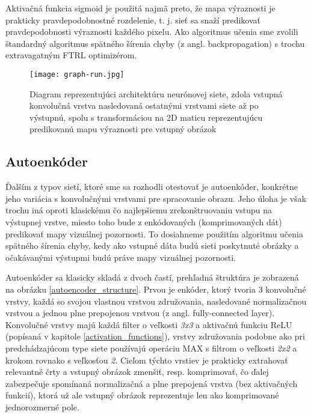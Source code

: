 Aktivačná funkcia sigmoid je použitá najmä preto, že mapa výraznosti je prakticky pravdepodobnostné rozdelenie, t. j. sieť sa snaží predikovať pravdepodobnosti výraznosti každého pixelu. Ako algoritmus učenia sme zvolili štandardný algoritmus spätného šírenia chyby (z angl. backpropagation) s trochu extravagatným FTRL optimizérom.

\begin{figure}[H]
	\begin{center}\texttt{[image: graph-run.jpg]}
		\caption[Návrh architektúry neurónovej siete]{
			Diagram reprezentujúci architektúru neurónovej siete, zdola vstupná konvolučná vrstva nasledovaná ostatnými vrstvami siete až po výstupnú, spolu s transformáciou na 2D maticu reprezentujúcu predikovanú mapu výraznosti pre vstupný obrázok
		}\label{my_tensorboard_cnn}
	\end{center}
\end{figure}

\subsection{Autoenkóder}
\label{autoencoder_design}
Ďalším z typov sietí, ktoré sme sa rozhodli otestovať je autoenkóder, konkrétne jeho variácia s konvolučnými vrstvami pre spracovanie obrazu. Jeho úloha je však trochu iná oproti klasickému čo najlepšiemu zrekonštruovaniu vstupu na výstupnej vrstve, miesto toho bude z enkódovaných (komprimovaných dát) predikovať mapy vizuálnej pozornosti. To dosiahneme použitím algoritmu učenia spätného šírenia chyby, kedy ako vstupné dáta budú sieti poskytnuté obrázky a očakávanými výstupmi budú práve mapy vizuálnej pozornosti.

Autoenkóder sa klasicky skladá z dvoch častí, prehľadná štruktúra je zobrazená na obrázku \ref{autoencoder_structure}. Prvou je enkóder, ktorý tvoria 3 konvolučné vrstvy, každá so svojou vlastnou vrstvou združovania, nasledované normalizačnou vrstvou a jednou plne prepojenou vrstvou (z angl. fully-connected layer). Konvolučné vrstvy majú každá filter o veľkosti \textit{3x3} a aktivačnú funkciu ReLU (popísaná v kapitole \ref{activation_functions}), vrstvy združovania podobne ako pri predchádzajúcom type siete používajú operáciu MAX s filtrom o veľkosti \textit{2x2} a krokom rovnako s veľkosťou \textit{2}. Cieľom týchto vrstiev je prakticky extrahovať relevantné črty a vstupný obrázok zmenšiť, resp. komprimovať, čo ďalej zabezpečuje spomínaná normalizačná a plne prepojená vrstva (bez aktivačných funkcií), ktorá už ale vstupný obrázok reprezentuje len ako komprimované jednorozmerné pole. 

